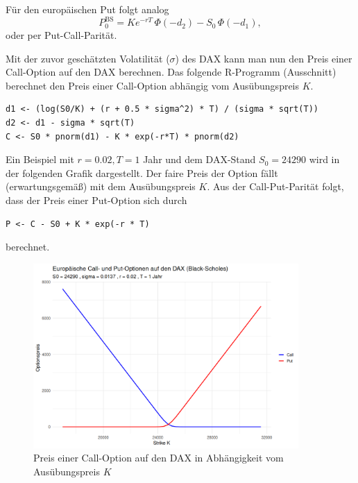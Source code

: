 \begin{bem}
Für den europäischen Put folgt analog
$$
P_0^{\mathrm{BS}} = K e^{-rT}\,\Phi(-d_2) - S_0\,\Phi(-d_1),
$$
oder per Put-Call-Parität.

\end{bem}

\begin{bsp}
Mit der zuvor geschätzten Volatilität ($\sigma$) des DAX kann
man nun den Preis einer Call-Option auf den DAX berechnen. Das folgende
R-Programm (Ausschnitt) berechnet den Preis einer Call-Option abhängig
vom Ausübungspreis $K$.

\begin{lstlisting}
d1 <- (log(S0/K) + (r + 0.5 * sigma^2) * T) / (sigma * sqrt(T))
d2 <- d1 - sigma * sqrt(T)
C <- S0 * pnorm(d1) - K * exp(-r*T) * pnorm(d2)
\end{lstlisting}
Ein Beispiel mit $r = 0.02, T = 1$ Jahr und dem DAX-Stand $S_0 = 24290$ wird in
der folgenden Grafik dargestellt. Der faire Preis der Option
fällt (erwartungsgemäß) mit dem Ausübungspreis $K$.
Aus der Call-Put-Parität folgt, dass der Preis einer Put-Option
sich durch

\begin{lstlisting}
P <- C - S0 + K * exp(-r * T)
\end{lstlisting}
berechnet.

\begin{figure}[H]
    \centering
    \includegraphics[width=0.9\textwidth]{images/dax_bs.png}
    \caption{Preis einer Call-Option auf den DAX in Abhängigkeit vom Ausübungspreis $K$}
    \label{fig:dax_bs}
\end{figure}

\end{bsp}

